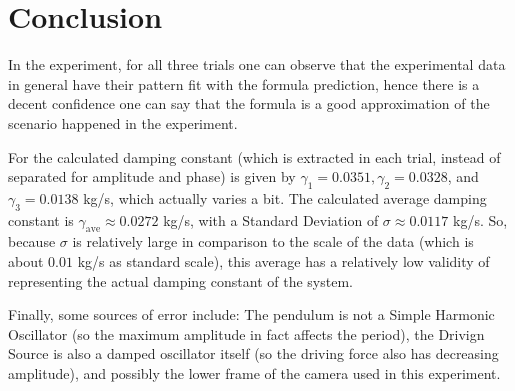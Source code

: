 \documentclass{article}
\begin{document}
\hfil

\section{Conclusion}

In the experiment, for all three trials one can observe that the experimental data in general have their pattern fit with the formula prediction, hence there is a decent confidence one can say that the formula is a good approximation of the scenario happened in the experiment.

For the calculated damping constant (which is extracted in each trial, instead of separated for amplitude and phase) is given by $\gamma_1 = 0.0351, \gamma_2 = 0.0328$, and $\gamma_3 = 0.0138$ kg/s, which actually varies a bit. The calculated average damping constant is $\gamma_\text{ave} \approx 0.0272$ kg/s, with a Standard Deviation of $\sigma \approx 0.0117$ kg/s. So, because $\sigma$ is relatively large in comparison to the scale of the data (which is about $0.01$ kg/s as standard scale), this average has a relatively low validity of representing the actual damping constant of the system.

\hfil

Finally, some sources of error include: The pendulum is not a Simple Harmonic Oscillator (so the maximum amplitude in fact affects the period), the Drivign Source is also a damped oscillator itself (so the driving force also has decreasing amplitude), and possibly the lower frame of the camera used in this experiment.
\end{document}
